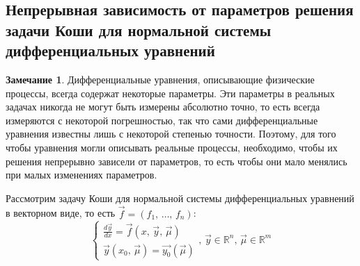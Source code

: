 \documentclass[a4paper,12pt]{article}
\theoremstyle{plain}
\theoremstyle{definition}
\newtheorem*{note}{Замечание}
\theoremstyle{remark}
\begin{document}
\subsection{Непрерывная зависимость от параметров решения задачи Коши для нормальной системы дифференциальных уравнений}
\begin{note}
	Дифференциальные уравнения, описывающие физические процессы, всегда содержат некоторые параметры. Эти параметры в реальных задачах никогда не могут быть измерены абсолютно точно, то есть всегда измеряются с некоторой погрешностью, так что сами дифференциальные уравнения известны лишь с некоторой степенью точности. Поэтому, для того чтобы уравнения могли описывать реальные процессы, необходимо, чтобы их решения непрерывно зависели от параметров, то есть чтобы они мало менялись при малых изменениях параметров.
\end{note}

Рассмотрим задачу Коши для нормальной системы дифференциальных уравнений в векторном виде, то есть $\vec{f} = (f_1,\,\ldots,\,f_n)$:
\begin{equation}\label{PARAM_CAUCHY}
	\begin{cases}
		\frac{d\vec{y}}{dx} = \vec{f}(x,\,\vec{y},\,\vec{\mu}) \\
		\vec{y}(x_0,\, \vec{\mu}) = \vec{y_0}(\vec{\mu})
	\end{cases},\, \vec{y} \in \mathbb{R}^n,\, \vec{\mu} \in \mathbb{R}^m
\end{equation}
\end{document}
